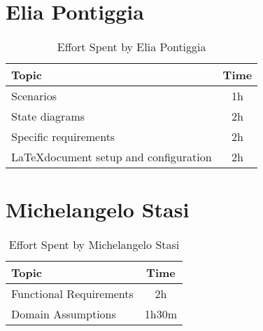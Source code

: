 \section*{Elia Pontiggia}
\begin{table}[ht]
    \centering
    \begin{tabular}{|l|c|}
        \hline
        \textbf{Topic}                                 & \textbf{Time} \\ \hline
        Scenarios                                      & 1h            \\ \hline
        State diagrams                                 & 2h            \\ \hline
        Specific requirements                          & 2h            \\ \hline
        \LaTeX \space document setup and configuration & 2h            \\ \hline
    \end{tabular}
    \caption{Effort Spent by Elia Pontiggia}
    \label{tab:pontiggia-effort-spent}
\end{table}

\section*{Michelangelo Stasi}
\begin{table}[ht]
    \centering
    \begin{tabular}{|l|c|}
        \hline
        \textbf{Topic}          & \textbf{Time} \\ \hline
        Functional Requirements & 2h            \\ \hline
        Domain Assumptions      & 1h30m         \\ \hline
    \end{tabular}
    \caption{Effort Spent by Michelangelo Stasi}
    \label{tab:stasi-effort-spent}
\end{table}

